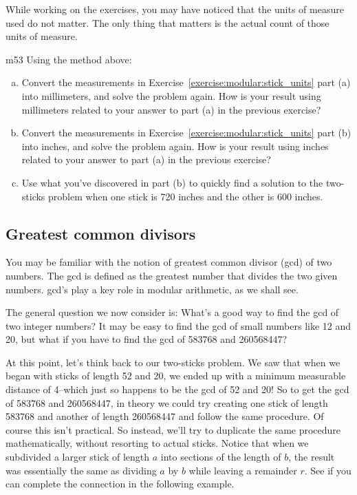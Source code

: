 While working on the exercises, you may have noticed that the units of measure used do not matter.  The only thing that matters is the actual count of those units of measure.  

\begin{exercise}{m53}
Using the method above:
\begin{enumerate}[(a)]
\item
Convert the measurements in Exercise~\ref{exercise:modular:stick_units} part (a) into millimeters, and solve the problem again. How is your result using millimeters related to your answer to part (a) in the previous exercise?
\item
Convert the measurements in Exercise~\ref{exercise:modular:stick_units} part (b) into inches, and solve the problem again. How is your result using inches related to your answer to part (a) in the previous exercise?
\item
Use what you've discovered in part (b) to quickly find a solution to the two-sticks problem when one stick is 720 inches and the other is 600 inches.
\end{enumerate}
\end{exercise}

\subsection{Greatest common divisors}
You may be  familiar with the notion of greatest common divisor (gcd) of two numbers.  The gcd is defined as the greatest number that divides the two given numbers. gcd's play a key role in modular arithmetic, as we shall see. 

The general question we now consider is: What's a good way to find the gcd of two integer numbers? It may be easy to find the gcd of small numbers like 12 and 20, but what if you have to find the gcd of 583768 and 260568447? 

At this point, let's think back to our two-sticks problem. We saw that when we began with sticks of length 52 and 20, we ended up with a minimum measurable distance of 4--which just so happens to be the gcd of 52 and 20! So to get the gcd of 583768 and 260568447, in theory we could try creating one stick of length 583768 and another of length 260568447 and follow the same procedure. Of course this isn't practical. So instead, we'll try to duplicate the same procedure mathematically, without resorting to actual sticks.  Notice that when we subdivided a larger stick of length $a$ into sections of the length of $b$, the result was essentially the same as dividing $a$ by $b$ while leaving a remainder $r$.  See if you can complete the connection in the following example.

